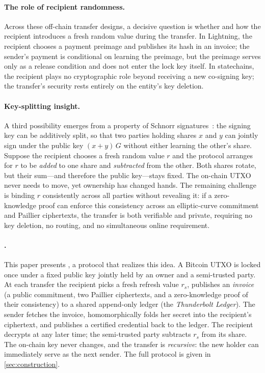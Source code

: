 \paragraph{The role of recipient randomness.} Across these off-chain transfer designs, a decisive question is whether and how the recipient introduces a fresh random value during the transfer. In Lightning, the recipient chooses a payment preimage and publishes its hash in an invoice; the sender's payment is conditional on learning the preimage, but the preimage serves only as a release condition and does not enter the lock key itself. In statechains, the recipient plays no cryptographic role beyond receiving a new co-signing key; the transfer's security rests entirely on the entity's key deletion.

\paragraph{Key-splitting insight.} A third possibility emerges from a property of Schnorr signatures~\cite{schnorr1991efficient}: the signing key can be additively split, so that two parties holding shares $x$ and $y$ can jointly sign under the public key $(x+y)\,G$ without either learning the other's share. Suppose the recipient chooses a fresh random value $r$ and the protocol arranges for $r$ to be \emph{added} to one share and \emph{subtracted} from the other. Both shares rotate, but their sum---and therefore the public key---stays fixed. The on-chain UTXO never needs to move, yet ownership has changed hands. The remaining challenge is binding $r$ consistently across all parties without revealing it: if a zero-knowledge proof can enforce this consistency across an elliptic-curve commitment and Paillier ciphertexts, the transfer is both verifiable and private, requiring no key deletion, no routing, and no simultaneous online requirement.

\paragraph{\thunderbolt.} This paper presents \thunderbolt, a protocol that realizes this idea. A Bitcoin UTXO is locked once under a fixed public key jointly held by an owner and a semi-trusted party. At each transfer the recipient picks a fresh refresh value $r_s$, publishes an \emph{invoice} (a public commitment, two Paillier ciphertexts, and a zero-knowledge proof of their consistency) to a shared append-only ledger (the \emph{Thunderbolt Ledger}). The sender fetches the invoice, homomorphically folds her secret into the recipient's ciphertext, and publishes a certified credential back to the ledger. The recipient decrypts at any later time; the semi-trusted party subtracts $r_s$ from its share. The on-chain key never changes, and the transfer is \emph{recursive}: the new holder can immediately serve as the next sender. The full protocol is given in \autoref{sec:construction}.

